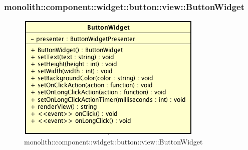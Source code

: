 \subsubsection{monolith::component::widget::button::view::ButtonWidget}

\label{monolith::component::widget::button::view::ButtonWidget}
\begin{figure}[ht]
	\centering
	\includegraphics[scale=0.5]{Sezioni/SottosezioniST/img/ButtonWidget.png}
	\caption{monolith::component::widget::button::view::ButtonWidget}
\end{figure}

